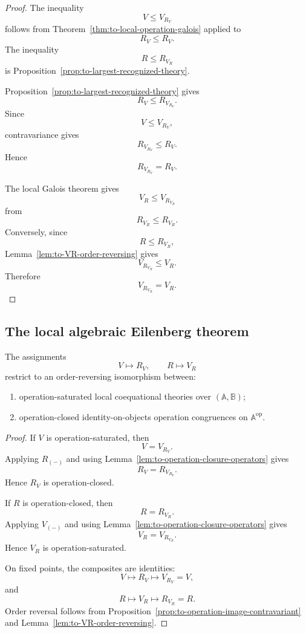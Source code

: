 \begin{proof}
    The inequality
    \[
        V\leq V_{R_V}
    \]
    follows from Theorem~\ref{thm:to-local-operation-galois} applied to
    \[
        R_V\leq R_V.
    \]
    The inequality
    \[
        R\leq R_{V_R}
    \]
    is Proposition~\ref{prop:to-largest-recognized-theory}.

    Proposition~\ref{prop:to-largest-recognized-theory} gives
    \[
        R_V\leq R_{V_{R_V}}.
    \]
    Since
    \[
        V\leq V_{R_V},
    \]
    contravariance gives
    \[
        R_{V_{R_V}}\leq R_V.
    \]
    Hence
    \[
        R_{V_{R_V}}=R_V.
    \]

    The local Galois theorem gives
    \[
        V_R\leq V_{R_{V_R}}
    \]
    from
    \[
        R_{V_R}\leq R_{V_R}.
    \]
    Conversely, since
    \[
        R\leq R_{V_R},
    \]
    Lemma~\ref{lem:to-VR-order-reversing} gives
    \[
        V_{R_{V_R}}\leq V_R.
    \]
    Therefore
    \[
        V_{R_{V_R}}=V_R.
    \]
\end{proof}

\subsection{The local algebraic Eilenberg theorem}
\label{subsec:to-local-algebraic-eilenberg-theorem}

\begin{theorem}
\label{thm:to-local-algebraic-eilenberg}
    The assignments
    \[
        V\longmapsto R_V,
        \qquad
        R\longmapsto V_R
    \]
    restrict to an order-reversing isomorphism between:
    \begin{enumerate}
        \item operation-saturated local coequational theories over
        \((\mathbb A,\mathbb B)\);
        \item operation-closed identity-on-objects operation congruences on
        \(\mathbb A^{\mathrm{op}}\).
    \end{enumerate}
\end{theorem}

\begin{proof}
    If \(V\) is operation-saturated, then
    \[
        V=V_{R_V}.
    \]
    Applying \(R_{(-)}\) and using
    Lemma~\ref{lem:to-operation-closure-operators} gives
    \[
        R_V=R_{V_{R_V}}.
    \]
    Hence \(R_V\) is operation-closed.

    If \(R\) is operation-closed, then
    \[
        R=R_{V_R}.
    \]
    Applying \(V_{(-)}\) and using
    Lemma~\ref{lem:to-operation-closure-operators} gives
    \[
        V_R=V_{R_{V_R}}.
    \]
    Hence \(V_R\) is operation-saturated.

    On fixed points, the composites are identities:
    \[
        V\mapsto R_V\mapsto V_{R_V}=V,
    \]
    and
    \[
        R\mapsto V_R\mapsto R_{V_R}=R.
    \]
    Order reversal follows from
    Proposition~\ref{prop:to-operation-image-contravariant} and
    Lemma~\ref{lem:to-VR-order-reversing}.
\end{proof}


